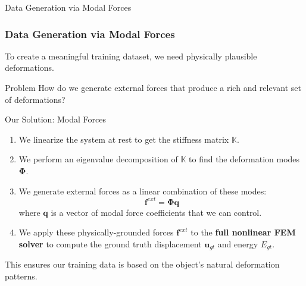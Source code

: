 \documentclass{beamer}
\begin{document}
\begin{frame}{Data Generation via Modal Forces}
    \frametitle{Data Generation via Modal Forces}
    
    To create a meaningful training dataset, we need physically plausible deformations.
    
    \begin{block}{Problem}
        How do we generate external forces that produce a rich and relevant set of deformations?
    \end{block}
    
    \begin{block}{Our Solution: Modal Forces}
        \begin{enumerate}
            \item We linearize the system at rest to get the stiffness matrix \(\mathbb{K}\).
            
            \item We perform an eigenvalue decomposition of \(\mathbb{K}\) to find the deformation modes \(\boldsymbol{\Phi}\).
            
            \item We generate external forces as a linear combination of these modes:
            \begin{equation*}
                \bm{f}^{ext} = \boldsymbol{\Phi} \bm{q}
            \end{equation*}
            where \(\bm{q}\) is a vector of modal force coefficients that we can control.
            
            \item We apply these physically-grounded forces \(\bm{f}^{ext}\) to the \textbf{full nonlinear FEM solver} to compute the ground truth displacement \(\bm{u}_{gt}\) and energy \(E_{gt}\).
        \end{enumerate}
    \end{block}
    
    This ensures our training data is based on the object's natural deformation patterns.
\end{frame}
\end{document}
